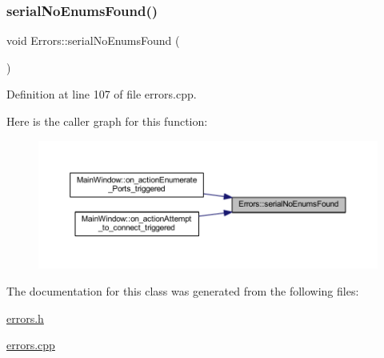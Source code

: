 \subsubsection{\texorpdfstring{serialNoEnumsFound()}{serialNoEnumsFound()}}
{\footnotesize\ttfamily void Errors\+::serial\+No\+Enums\+Found (\begin{DoxyParamCaption}{ }\end{DoxyParamCaption})\hspace{0.3cm}{\ttfamily [static]}}



Definition at line 107 of file errors.\+cpp.

Here is the caller graph for this function\+:
\nopagebreak
\begin{figure}[H]
\begin{center}
\leavevmode
\includegraphics[width=350pt]{classErrors_a4d1bdcbd36b5df8317a4511226c5d55a_icgraph}
\end{center}
\end{figure}


The documentation for this class was generated from the following files\+:\begin{DoxyCompactItemize}
\item 
\mbox{\hyperlink{errors_8h}{errors.\+h}}\item 
\mbox{\hyperlink{errors_8cpp}{errors.\+cpp}}\end{DoxyCompactItemize}

